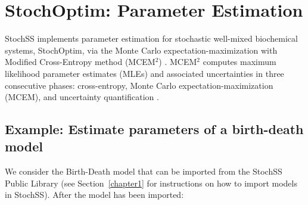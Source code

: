 
\chapter{StochOptim: Parameter Estimation}
\label{chapter-stochoptim}

StochSS implements parameter estimation for stochastic well-mixed biochemical systems, StochOptim, via the Monte Carlo expectation-maximization with Modified Cross-Entropy method (MCEM$^2$) \cite{bernie}.
MCEM$^2$ computes maximum likelihood parameter estimates (MLEs) and associated uncertainties in three consecutive phases: cross-entropy, Monte Carlo expectation-maximization (MCEM), and uncertainty quantification \cite{bernie}.

\section{Example: Estimate parameters of a birth-death model}
We consider the Birth-Death model that can be imported from the StochSS Public Library (see Section~\ref{chapter1} for instructions on how to import models in StochSS).
After the model has been imported:
